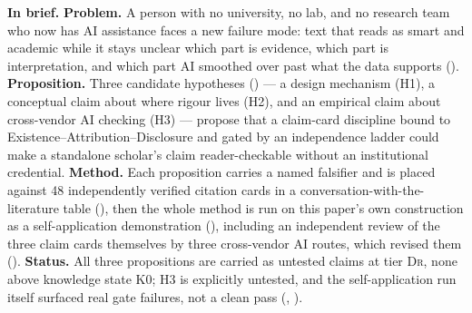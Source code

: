 \documentclass[10pt,twocolumn]{article}
\newcommand{\DrTier}{\textsc{Dr}}
\begin{document}
\vspace{0.6em}
\noindent\colorbox{BriefBg}{%
  \begin{minipage}{\linewidth}
  \small
  \textbf{In brief.} \textbf{Problem.} A person with no university, no lab, and no research team
  who now has AI assistance faces a new failure mode: text that reads as smart and academic while
  it stays unclear which part is evidence, which part is interpretation, and which part AI smoothed
  over past what the data supports (). \textbf{Proposition.} Three candidate
  hypotheses () --- a design mechanism (H1), a conceptual claim about where
  rigour lives (H2), and an empirical claim about cross-vendor AI checking (H3) --- propose that a
  claim-card discipline bound to Existence--Attribution--Disclosure and gated by an independence
  ladder could make a standalone scholar's claim reader-checkable without an institutional
  credential. \textbf{Method.} Each proposition carries a named falsifier and is placed against 48
  independently verified citation cards in a conversation-with-the-literature table
  (), then the whole method is run on this paper's own construction as a
  self-application demonstration (), including an independent review of the
  three claim cards themselves by three cross-vendor AI routes, which revised them
  (). \textbf{Status.} All three
  propositions are carried as untested claims at tier \DrTier{}, none above knowledge state K0; H3
  is explicitly untested, and the self-application run itself surfaced real gate failures, not a
  clean pass (, ).
  \end{minipage}%
}
\end{document}
